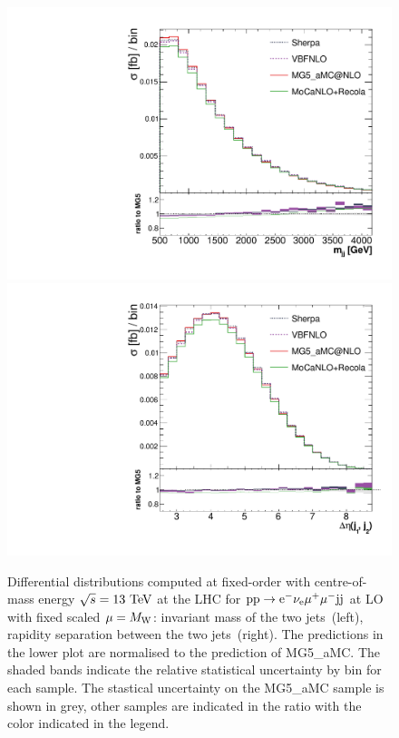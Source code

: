 \documentclass[11pt]{cernrep}
\begin{document}
\begin{figure}[htbp]
\begin{center}
   \includegraphics[scale=0.375]{figs/mjj_FixedOrder.pdf}
   \includegraphics[scale=0.375]{figs/dEtajj_FixedOrder.pdf}
\caption{Differential distributions computed at fixed-order with centre-of-mass energy $\sqrt{s}=13{\rm~TeV}$ at the LHC for ${\rm p} {\rm p}
  \to {\rm e}^-  \nu_{\rm e}  \mu^+ \mu^- {\rm j} {\rm j}$ at LO with fixed scaled $\mu = M_{\rm W}$: 
                invariant mass of the two jets~(left),
                rapidity separation between the two jets~(right).
                The predictions in the lower plot are normalised to the prediction of {\sc MG5\_aMC}.
								The shaded bands indicate the relative statistical uncertainty by bin for each sample.
								The stastical uncertainty on the {\sc MG5\_aMC} sample is shown in grey, other samples
								are indicated in the ratio with the color indicated in the legend.
                }
\label{vbs_fig_fixed_order}
\end{center}
\end{figure}
\end{document}
